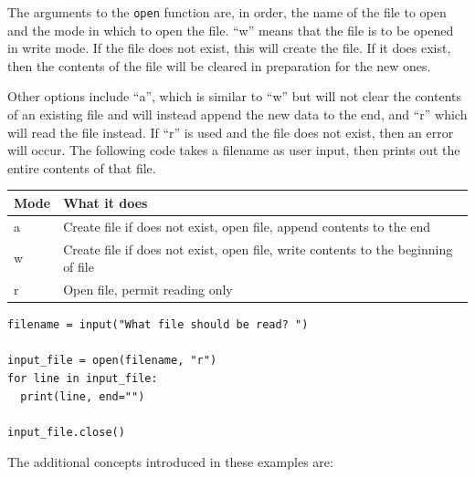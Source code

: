 \documentclass[11pt]{cselabheader}
\begin{document}
The arguments to the \lstinline{open} function are, in order, the name of the
file to open and the mode in which to open the file. ``w'' means that the file
is to be opened in write mode. If the file does not exist, this will create the
file. If it does exist, then the contents of the file will be cleared in
preparation for the new ones.

Other options include ``a'', which is similar to ``w'' but will not clear the
contents of an existing file and will instead append the new data to the end,
and ``r'' which will read the file instead. If ``r'' is used and the file does
not exist, then an error will occur. The following code takes a filename as user
input, then prints out the entire contents of that file.

\begin{table}[!ht]
  \centering
  \begin{tabular}{ll}
    Mode & What it does \\
    \midrule
    a & Create file if does not exist, open file, append contents to the end \\
    w & Create file if does not exist, open file, write contents to the beginning
    of file \\
    r & Open file, permit reading only \\
  \end{tabular}
\end{table}

\begin{lstlisting}[style=python]
filename = input("What file should be read? ")

input_file = open(filename, "r")
for line in input_file:
  print(line, end="")

input_file.close()
\end{lstlisting}

The additional concepts introduced in these examples are:
\end{document}
